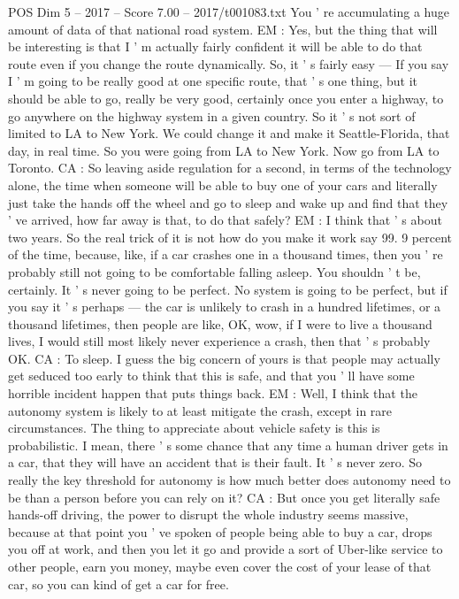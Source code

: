 \begin{textsample}{POS Dim 5 – 2017 – Score 7.00 – 2017/t001083.txt}
You ' re accumulating a huge amount of data of that national road system.
EM : Yes, but the thing that will be interesting is that I ' m actually fairly confident it will be able to do that route even if you change the route dynamically.
So, it ' s fairly easy — If you say I ' m going to be really good at one specific route, that ' s one thing, but it should be able to go, really be very good, certainly once you enter a highway, to go anywhere on the highway system in a given country.
So it ' s not sort of limited to LA to New York.
We could change it and make it Seattle-Florida, that day, in real time.
So you were going from LA to New York.
Now go from LA to Toronto.
CA : So leaving aside regulation for a second, in terms of the technology alone, the time when someone will be able to buy one of your cars and literally just take the hands off the wheel and go to sleep and wake up and find that they ' ve arrived, how far away is that, to do that safely?
EM : I think that ' s about two years.
So the real trick of it is not how do you make it work say 99. 9 percent of the time, because, like, if a car crashes one in a thousand times, then you ' re probably still not going to be comfortable falling asleep.
You shouldn ' t be, certainly.
It ' s never going to be perfect.
No system is going to be perfect, but if you say it ' s perhaps — the car is unlikely to crash in a hundred lifetimes, or a thousand lifetimes, then people are like, OK, wow, if I were to live a thousand lives, I would still most likely never experience a crash, then that ' s probably OK.
CA : To sleep.
I guess the big concern of yours is that people may actually get seduced too early to think that this is safe, and that you ' ll have some horrible incident happen that puts things back.
EM : Well, I think that the autonomy system is likely to at least mitigate the crash, except in rare circumstances.
The thing to appreciate about vehicle safety is this is probabilistic.
I mean, there ' s some chance that any time a human driver gets in a car, that they will have an accident that is their fault.
It ' s never zero.
So really the key threshold for autonomy is how much better does autonomy need to be than a person before you can rely on it?
CA : But once you get literally safe hands-off driving, the power to disrupt the whole industry seems massive, because at that point you ' ve spoken of people being able to buy a car, drops you off at work, and then you let it go and provide a sort of Uber-like service to other people, earn you money, maybe even cover the cost of your lease of that car, so you can kind of get a car for free.

\end{textsample}
